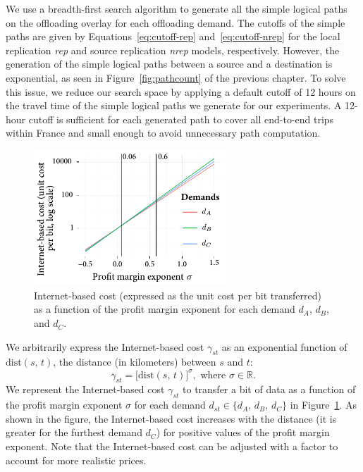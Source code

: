 We use a breadth-first search algorithm to generate all the simple logical paths on the offloading overlay for each offloading demand. The cutoffs of the simple paths are given by Equations~\ref{eq:cutoff-rep} and~\ref{eq:cutoff-nrep} for the local replication \textit{rep} and source replication \textit{nrep} models, respectively. However, the generation of the simple logical paths between a source and a destination is exponential, as seen in Figure~\ref{fig:pathcount} of the previous chapter. To solve this issue, we reduce our search space by applying a default cutoff of 12 hours on the travel time of the simple logical paths we generate for our experiments. A 12-hour cutoff is sufficient for each generated path to cover all end-to-end trips within France and small enough to avoid unnecessary path computation.

\begin{figure}
    \vspace{-15pt}
    \includegraphics[width=7.2cm]{results/ton-demand-price-km.pdf}
    \caption{Internet-based cost (expressed as the unit cost per bit transferred) as a function of the profit margin exponent for each demand $d_A$, $d_B$, and $d_C$.}
    \label{fig:demand-price-km}
\end{figure}
We arbitrarily express the Internet-based cost $\gamma_{st}$ as an exponential function of $\text{dist}(s,\,t)$, the distance (in kilometers) between $s$ and $t$:
\begin{equation}
    \gamma_{st} = \big[\text{dist}(s,\,t)\big]^{\sigma}, \text{ where } \sigma\in\mathbb{R}.
\end{equation}
We represent the Internet-based cost $\gamma_{st}$ to transfer a bit of data as a function of the profit margin exponent $\sigma$ for each demand $d_{st}\in\{d_A,\,d_B,\,d_C\}$ in Figure~\ref{fig:demand-price-km}. As shown in the figure, the Internet-based cost increases with the distance (\eg it is greater for the furthest demand $d_C$) for positive values of the profit margin exponent. Note that the Internet-based cost can be adjusted with a factor to account for more realistic prices.

